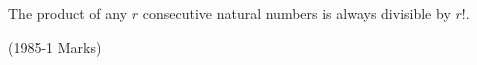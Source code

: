 \iffalse
 \title{ASSIGNMENT-1}
 \author{EE24BTECH11008-ASLIN GARVASIS}
 \section{true-false}
\fi
\item The product of any $r$ consecutive natural numbers is always
 divisible by $r!.$
 
\hfill {(1985-1 Marks)}  \\

